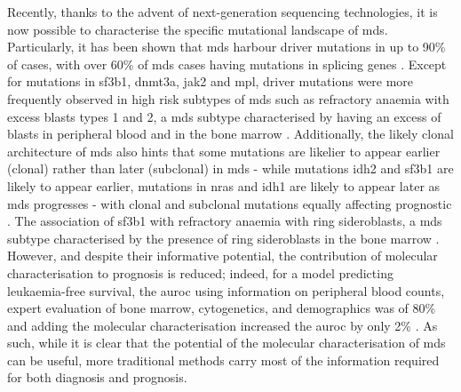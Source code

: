 Recently, thanks to the advent of next-generation sequencing technologies, it is now possible to characterise the specific mutational landscape of \ac{mds}. Particularly, it has been shown that \ac{mds} harbour driver mutations in up to 90\% of cases, with over 60\% of \ac{mds} cases having mutations in splicing genes \cite{Papaemmanuil2013-yt,Haferlach2014-bh}. Except for mutations in \ac{sf3b1}, \ac{dnmt3a}, \ac{jak2} and \ac{mpl}, driver mutations were more frequently observed in high risk subtypes of \ac{mds} such as refractory anaemia with excess blasts types 1 and 2, a \ac{mds} subtype characterised by having an excess of blasts in peripheral blood and in the bone marrow \cite{Haferlach2014-bh}. Additionally, the likely clonal architecture of \ac{mds} also hints that some mutations are likelier to appear earlier (clonal) rather than later (subclonal) in \ac{mds} - while mutations \ac{idh2} and \ac{sf3b1} are likely to appear earlier, mutations in \ac{nras} and \ac{idh1} are likely to appear later as \ac{mds} progresses - with clonal and subclonal mutations equally affecting prognostic \cite{Papaemmanuil2013-yt}. The association of \ac{sf3b1} with refractory anaemia with ring sideroblasts, a \ac{mds} subtype characterised by the presence of ring sideroblasts in the bone marrow \cite{Papaemmanuil201 , Papaemmanuil2013-yt, Haferlach2014-bh}. However, and despite their informative potential, the contribution of molecular characterisation to prognosis is reduced; indeed, for a model predicting leukaemia-free survival, the \ac{auroc} using information on peripheral blood counts, expert evaluation of bone marrow, cytogenetics, and demographics was of 80\% and adding the molecular characterisation increased the \ac{auroc} by only 2\% \cite{Papaemmanuil2013-yt}. As such, while it is clear that the potential of the molecular characterisation of \ac{mds} can be useful, more traditional methods carry most of the information required for both diagnosis and prognosis.

